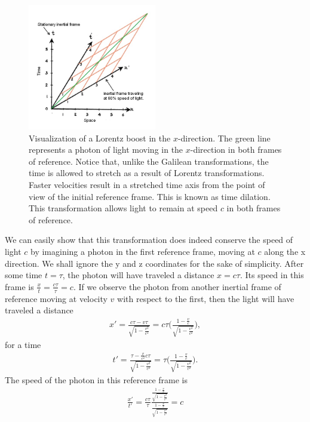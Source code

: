 \documentclass[titlepage,letterpaper,onecolumn,11pt,final]{report}
\numberwithin{equation}{section}
\numberwithin{figure}{section}
\begin{document}
\begin{figure}[!htb]
\centering
\includegraphics[trim={0cm 0cm 0cm 0cm},clip,width=0.5\textwidth]{lorentz_Transformation.jpg}
\caption{\label{fig:lorentz} Visualization of a Lorentz boost in the $x$-direction. The green line represents a photon of light moving in the $x$-direction in both frames of reference. Notice that, unlike the Galilean transformations, the time is allowed to stretch as a result of Lorentz transformations. Faster velocities result in a stretched time axis from the point of view of the initial reference frame. This is known as time dilation. This transformation allows light to remain at speed $c$ in both frames of reference.}
\end{figure}

We can easily show that this transformation does indeed conserve the speed of light $c$ by imagining a photon in the first reference frame, moving at $c$ along the x direction. We shall ignore the y and z coordinates for the sake of simplicity. After some time $t = \tau$, the photon will have traveled a distance $x = c\tau$. Its speed in this frame is $\frac{x}{t} = \frac{c\tau}{\tau} = c$. If we observe the photon from another inertial frame of reference moving at velocity $v$ with respect to the first, then the light will have traveled a distance
\begin{gather}
	x' = \frac{c\tau - v\tau}{\sqrt{1 - \frac{v^{2}}{c^{2}}}} = c \tau \Bigg( \frac{1 - \frac{v}{c}}{\sqrt{1 - \frac{v^{2}}{c^{2}}}} \Bigg),
\end{gather}
%
for a time 
\begin{gather}
	t' = \frac{\tau - \frac{v}{c^{2}} c \tau}{\sqrt{1 - \frac{v^{2}}{c^{2}}}} = \tau \Bigg( \frac{1 - \frac{v}{c}}{\sqrt{1 - \frac{v^{2}}{c^{2}}}} \Bigg).
\end{gather}
%
The speed of the photon in this reference frame is
\begin{gather}
	\frac{x'}{t'} = \frac{c \tau}{\tau} \frac{\frac{1 - \frac{v}{c}}{\sqrt{1 - \frac{v^{2}}{c^{2}}}}}{\frac{1 - \frac{v}{c}}{\sqrt{1 - \frac{v^{2}}{c^{2}}}}} = c
\end{gather}
\end{document}
